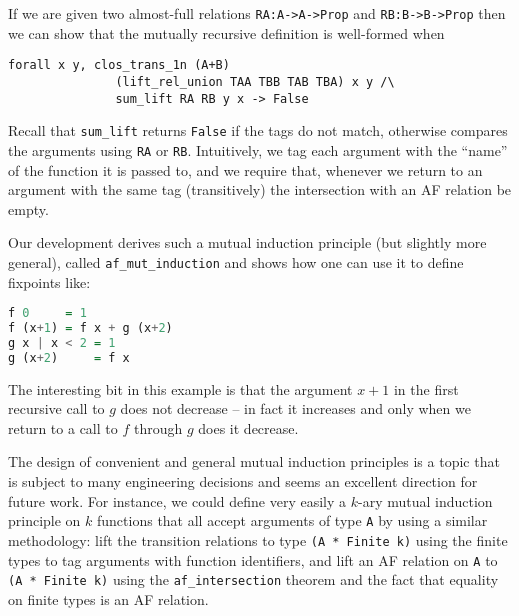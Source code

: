 \documentclass{llncs}
\begin{document}
If we are given two almost-full relations \lstinline|RA:A->A->Prop| and \lstinline|RB:B->B->Prop| then 
we can show that the mutually recursive definition is well-formed when
\begin{lstlisting}
forall x y, clos_trans_1n (A+B) 
               (lift_rel_union TAA TBB TAB TBA) x y /\ 
               sum_lift RA RB y x -> False
\end{lstlisting}
Recall that \lstinline|sum_lift| returns \lstinline|False| if the tags do not match, otherwise compares 
the arguments using \lstinline|RA| or \lstinline|RB|. Intuitively, we tag each argument with the ``name'' 
of the function it is passed to, and we require that, whenever we return to an argument with the same 
tag (transitively) the intersection with an AF relation be empty. 

Our development derives such a mutual induction principle (but slightly more general), called 
\lstinline|af_mut_induction| and shows how one can use it to define fixpoints like:
\begin{lstlisting}[language=hs]
f 0     = 1 
f (x+1) = f x + g (x+2)
g x | x < 2 = 1
g (x+2)     = f x 
\end{lstlisting}
The interesting bit in this example is that the argument $x+1$ in the first recursive
call to $g$ does not decrease -- in fact it increases and only when we return to a call
to $f$ through $g$ does it decrease. 

The design of convenient and general mutual induction principles is a topic that is subject 
to many engineering decisions and seems an excellent direction for future work. For instance, 
we could define very easily a $k$-ary mutual induction principle on $k$ functions that all 
accept arguments of type \lstinline|A| by using a similar methodology: lift the transition relations 
to type \lstinline|(A * Finite k)| using the finite types to tag arguments with function identifiers, and 
lift an AF relation on \lstinline|A| to \lstinline|(A * Finite k)| using the \lstinline|af_intersection| 
theorem and the fact that equality on finite types is an AF relation. 
\end{document}

